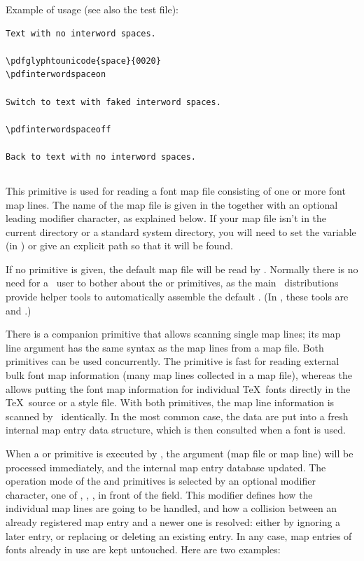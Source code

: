 \documentclass{pdftexmanual}
\begin{document}
Example of usage (see also the  test file):

\begin{verbatim}
Text with no interword spaces.

\pdfglyphtounicode{space}{0020}
\pdfinterwordspaceon

Switch to text with faked interword spaces.

\pdfinterwordspaceoff

Back to text with no interword spaces.
\end{verbatim}

\subsection{}

This primitive is used for reading a font map file consisting of one or
more font map lines. The name of the map file is given in the
 together with an optional leading modifier
character, as explained below. If your map file isn't in the current
directory or a standard system directory, you will need to set the
 variable (in \WEBC) or give an explicit path so that
it will be found.

If no  primitive is given, the default map file
 will be read by \PDFTEX. Normally there is no need
for a \PDFTEX\ user to bother about the  or
 primitives, as the main \TEX\ distributions provide
helper tools to automatically assemble the default .
(In \TEXLIVE, these tools are  and .)

There is a companion primitive  that allows scanning
single map lines; its map line argument has the same syntax as the map
lines from a map file. Both primitives can be used concurrently. The
 primitive is fast for reading external bulk font map
information (many map lines collected in a map file), whereas the
 allows putting the font map information for individual
\TeX\ fonts directly in the \TeX\ source or a style file. With both
primitives, the map line information is scanned by \PDFTEX\ identically.
In the most common case, the data are put into a fresh internal map
entry data structure, which is then consulted when a font is used.

When a  or  primitive is executed by
\PDFTEX, the argument (map file or map line) will be processed
immediately, and the internal map entry database updated. The operation
mode of the  and  primitives is selected
by an optional modifier character, one of \type{+}, \type{=}, \type{-},
in front of the  field. This modifier defines how the
individual map lines are going to be handled, and how a collision
between an already registered map entry and a newer one is resolved:
either by ignoring a later entry, or replacing or deleting an existing
entry. In any case, map entries of fonts already in use are kept
untouched. Here are two examples:
\end{document}
